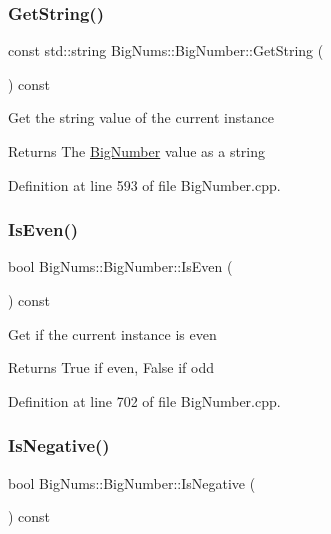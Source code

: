 \subsubsection{\texorpdfstring{GetString()}{GetString()}}
{\footnotesize\ttfamily const std\+::string Big\+Nums\+::\+Big\+Number\+::\+Get\+String (\begin{DoxyParamCaption}{ }\end{DoxyParamCaption}) const}

Get the string value of the current instance \begin{DoxyReturn}{Returns}
The \mbox{\hyperlink{class_big_nums_1_1_big_number}{Big\+Number}} value as a string 
\end{DoxyReturn}


Definition at line 593 of file Big\+Number.\+cpp.

\mbox{\label{class_big_nums_1_1_big_number_abf9a23b42aa137baa8a040a6cf524cca}} 
\subsubsection{\texorpdfstring{IsEven()}{IsEven()}}
{\footnotesize\ttfamily bool Big\+Nums\+::\+Big\+Number\+::\+Is\+Even (\begin{DoxyParamCaption}{ }\end{DoxyParamCaption}) const}

Get if the current instance is even \begin{DoxyReturn}{Returns}
True if even, False if odd 
\end{DoxyReturn}


Definition at line 702 of file Big\+Number.\+cpp.

\mbox{\label{class_big_nums_1_1_big_number_af5203c02639f6dc409016bfb4710dafc}} 
\subsubsection{\texorpdfstring{IsNegative()}{IsNegative()}}
{\footnotesize\ttfamily bool Big\+Nums\+::\+Big\+Number\+::\+Is\+Negative (\begin{DoxyParamCaption}{ }\end{DoxyParamCaption}) const}

